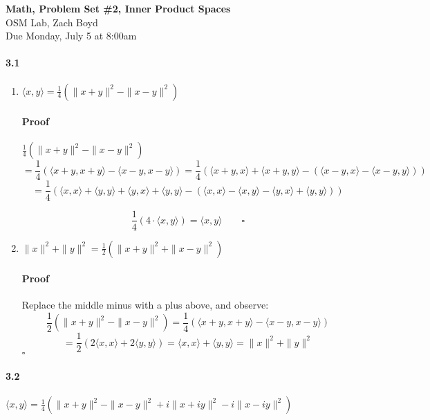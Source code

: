 \documentclass[letterpaper,12pt]{article}
\theoremstyle{definition}
\begin{document}
\begin{flushleft}
   \textbf{\large{Math, Problem Set \#2, Inner Product Spaces}} \\[5pt]
   OSM Lab, Zach Boyd \\[5pt]
   Due Monday, July 5 at 8:00am
\end{flushleft}

\vspace{5mm}
   
   
   
\paragraph{3.1} 
\begin{enumerate}[label=(\roman*)]
	\item  $\langle x , y \rangle = \frac{1}{4} ( \| x + y\|^2 - \| x - y\|^2) $
	\paragraph{Proof} $\frac{1}{4} ( \| x + y\|^2 - \| x - y\|^2)$ $$ =\frac{1}{4} (\langle x + y , x + y \rangle - \langle x - y , x - y \rangle) = \frac{1}{4} (\langle x + y , x \rangle + \langle x + y , y \rangle - (\langle x - y , x \rangle - \langle x - y , y \rangle))$$
    $$= \frac{1}{4} (\langle x , x \rangle + \langle y , y \rangle + \langle y , x \rangle + \langle y , y \rangle - (\langle x , x \rangle - \langle x, y \rangle - \langle y , x \rangle + \langle y , y \rangle)) $$
    
   $$ \frac{1}{4} (  4 \cdot \langle x, y \rangle) =  \langle x, y \rangle \qquad \square $$


	\item $\| x \|^2 + \| y\|^2 = \frac{1}{2} (\| x + y\|^2 + \| x - y\|^2)$
    \paragraph{Proof} Replace the middle minus with a plus above, and observe: $$\frac{1}{2} ( \| x + y\|^2 - \| x - y\|^2) =\frac{1}{4} (\langle x + y , x + y \rangle - \langle x - y , x - y \rangle)$$ $$= \frac{1}{2}(2\langle x , x \rangle + 2 \langle y , y \rangle) = \langle x , x \rangle + \langle y , y \rangle = \| x \|^2 + \| y\|^2 $$ $\square$
\end{enumerate}



\paragraph{3.2} $\langle x , y \rangle = \frac{1}{4} ( \| x + y\|^2 - \| x - y\|^2 + i\| x + iy\|^2 -i \| x - iy\|^2)$
\end{document}
